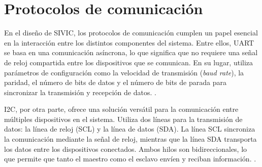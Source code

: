 \section{Protocolos de comunicación}

En el diseño de SIVIC, los protocolos de comunicación cumplen un papel esencial en la interacción entre los distintos componentes del sistema. Entre ellos, UART se basa en una comunicación asíncrona, lo que significa que no requiere una señal de reloj compartida entre los dispositivos que se comunican. En su lugar, utiliza parámetros de configuración como la velocidad de transmisión (\textit{baud rate}), la paridad, el número de bits de datos y el número de bits de parada para sincronizar la transmisión y recepción de datos. \citep{WEBSITE:uart}.

I2C, por otra parte, ofrece una solución versátil para la comunicación entre múltiples dispositivos en el sistema. Utiliza dos líneas para la transmisión de datos: la línea de reloj (SCL) y la línea de datos (SDA). La línea SCL sincroniza la comunicación mediante la señal de reloj, mientras que la línea SDA transporta los datos entre los dispositivos conectados. Ambos hilos son bidireccionales, lo que permite que tanto el maestro como el esclavo envíen y reciban información. \citep{WEBSITE:i2c}.
